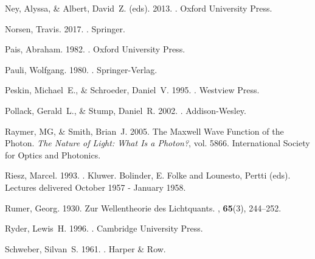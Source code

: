 \documentclass[12pt,secnumarabic,amsmath,amssymb,balancelastpage,nofootinbib]{article}
\begin{document}
\begin{thebibliography}{}
Ney, Alyssa, \& Albert, David~Z. (eds). 2013.
.
\newblock Oxford University Press.

Norsen, Travis. 2017.
.
\newblock Springer.

Pais, Abraham. 1982.
.
\newblock Oxford University Press.

Pauli, Wolfgang. 1980.
.
\newblock Springer-Verlag.

Peskin, Michael~E., \& Schroeder, Daniel~V. 1995.
.
\newblock Westview Press.

Pollack, Gerald~L., \& Stump, Daniel~R. 2002.
.
\newblock Addison-Wesley.

Raymer, MG, \& Smith, Brian~J. 2005.
\newblock The Maxwell Wave Function of the Photon.
 {\em The Nature of Light: What Is a
  Photon?},  vol. 5866.
\newblock International Society for Optics and Photonics.

Riesz, Marcel. 1993.
.
\newblock Kluwer.
\newblock Bolinder, E. Folke and Lounesto, Pertti (eds). Lectures delivered
  October 1957 - January 1958.

Rumer, Georg. 1930.
\newblock Zur Wellentheorie des Lichtquants.
, {\bf 65}(3), 244--252.

Ryder, Lewis~H. 1996.
.
\newblock Cambridge University Press.

Schweber, Silvan~S. 1961.
.
\newblock Harper \& Row.


\end{thebibliography}
\end{document}
